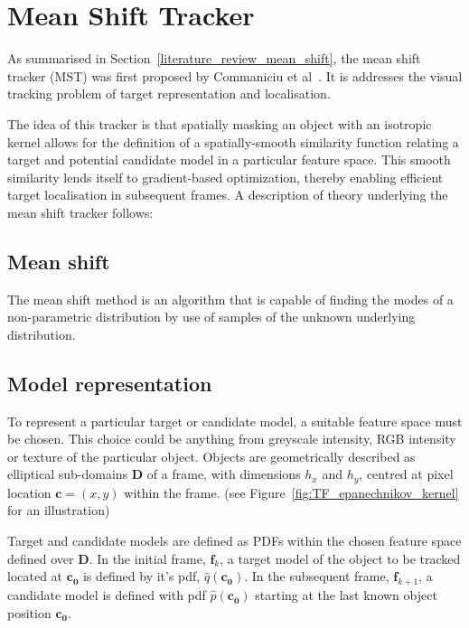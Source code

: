 

\section{Mean Shift Tracker}\label{theoretical_framework_mean_shift_tracker}
As summarised in Section~\ref{literature_review_mean_shift}, the mean shift
tracker (MST) was first proposed by Commaniciu et al~\cite{Comaniciu2003}. It is
addresses the visual tracking problem of target representation and localisation.

The idea of this tracker is that spatially masking an object with an
isotropic kernel allows for the definition of a spatially-smooth similarity
function relating a target and potential candidate model in a particular feature
space. This smooth similarity lends itself to gradient-based optimization,
thereby enabling efficient target localisation in subsequent frames.
A description of theory underlying the mean shift tracker follows:

\subsection{Mean shift}\label{theoretical_framework_mean_shift}
The mean shift method is an algorithm that is capable of finding the modes of a 
non-parametric distribution by use of samples of the unknown underlying distribution. 

\subsection{Model representation}
To represent a particular target or candidate model, a suitable feature space
must be chosen. This choice could be anything from greyscale intensity, RGB
intensity or texture of the particular object. Objects are geometrically described 
as elliptical sub-domains $\mathbf{D}$ of a frame, with dimensions $h_x$ and
$h_y$, centred at pixel location $\mathbf{c}=(x,y)$ within the frame. (see
Figure~\ref{fig:TF_epanechnikov_kernel} for an illustration)

Target and candidate models are defined as PDFs within the chosen feature
space defined over $\mathbf{D}$. In the initial frame, $\mathbf{f}_k$, a target
model of the object to be tracked located at $\mathbf{c_0}$ is defined by it's
pdf, $\hat{q}(\mathbf{c_0})$. In the subsequent frame, $\mathbf{f}_{k+1}$, a
candidate model is defined with pdf $\hat{p}(\mathbf{c_0})$ starting at the last
known object position $\mathbf{c_0}$. 

